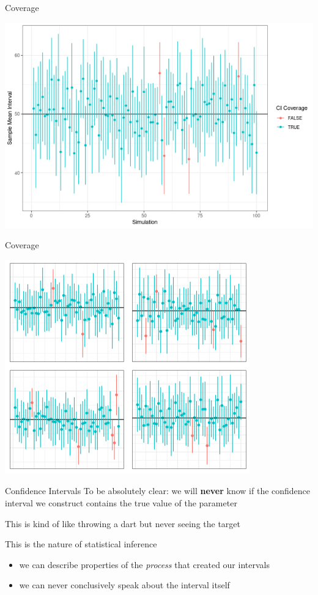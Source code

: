 \documentclass{beamer}
\begin{document}
\begin{frame}{Coverage}
\begin{center}
\includegraphics[scale=0.5]{cover4.png}
\end{center}
\end{frame}

\begin{frame}{Coverage}
\begin{center}
\includegraphics[scale=0.6]{all_ci100.png}
\end{center}
\end{frame}

\begin{frame}{Confidence Intervals}
To be absolutely clear: we will \textbf{never} know if the confidence interval we construct contains the true value of the parameter \vspace{8mm}

This is kind of like throwing a dart but never seeing the target \vspace{8mm}

This is the nature of statistical inference
\begin{itemize}
    \item we can describe properties of the \textit{process} that created our intervals
    \item we can never conclusively speak about the interval itself
\end{itemize}
\end{frame}
\end{document}
